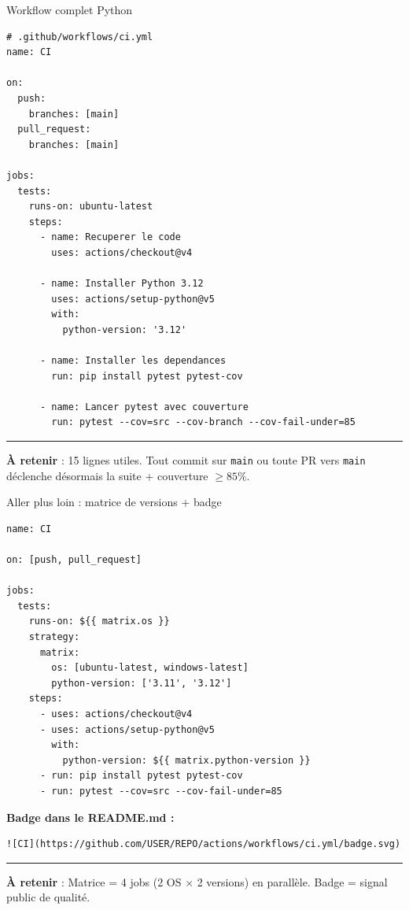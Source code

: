 \documentclass[aspectratio=169,11pt]{beamer}
\newcommand{\takeaway}[1]{%
\vfill\begin{beamercolorbox}[wd=\linewidth,sep=0.4em]{}
\color{accent2}\rule[0.6ex]{1.2em}{1.2pt}\hspace{0.4em}%
\textbf{\color{accent2}\small À retenir} \textcolor{textsoft}{:} %
{\small\color{textmain}#1}
\end{beamercolorbox}}
\begin{document}
\begin{frame}[fragile,t,shrink=18]{Workflow complet Python}
\begin{lstlisting}[style=yamldark]
# .github/workflows/ci.yml
name: CI

on:
  push:
    branches: [main]
  pull_request:
    branches: [main]

jobs:
  tests:
    runs-on: ubuntu-latest
    steps:
      - name: Recuperer le code
        uses: actions/checkout@v4

      - name: Installer Python 3.12
        uses: actions/setup-python@v5
        with:
          python-version: '3.12'

      - name: Installer les dependances
        run: pip install pytest pytest-cov

      - name: Lancer pytest avec couverture
        run: pytest --cov=src --cov-branch --cov-fail-under=85
\end{lstlisting}
\takeaway{15 lignes utiles. Tout commit sur \texttt{main} ou toute PR vers \texttt{main} déclenche désormais la suite + couverture $\geq 85\%$.}
\end{frame}

\begin{frame}[fragile,t,shrink=20]{Aller plus loin : matrice de versions + badge}
\begin{lstlisting}[style=yamldark]
name: CI

on: [push, pull_request]

jobs:
  tests:
    runs-on: ${{ matrix.os }}
    strategy:
      matrix:
        os: [ubuntu-latest, windows-latest]
        python-version: ['3.11', '3.12']
    steps:
      - uses: actions/checkout@v4
      - uses: actions/setup-python@v5
        with:
          python-version: ${{ matrix.python-version }}
      - run: pip install pytest pytest-cov
      - run: pytest --cov=src --cov-fail-under=85
\end{lstlisting}
\vspace{0.2em}\footnotesize
\textbf{Badge dans le README.md :}
\begin{lstlisting}[style=bashdark]
![CI](https://github.com/USER/REPO/actions/workflows/ci.yml/badge.svg)
\end{lstlisting}
\takeaway{Matrice = 4 jobs (2 OS × 2 versions) en parallèle. Badge = signal public de qualité.}
\end{frame}
\end{document}
